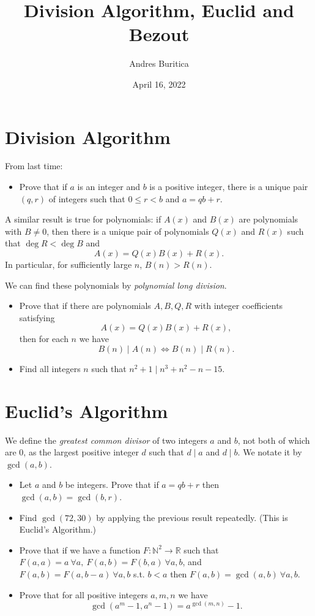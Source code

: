 \documentclass{article}
\title{Division Algorithm, Euclid and Bezout}
\author{Andres Buritica}
\date{April 16, 2022}
\begin{document}
\maketitle
\section{Division Algorithm}
  From last time: 
  \begin{itemize}
    \item Prove that if $a$ is an integer and $b$ is a positive integer, there
      is a unique pair $(q,r)$ of integers such that $0\le r<b$ and $a=qb+r$.
  \end{itemize}
  A similar result is true for polynomials: if $A(x)$ and $B(x)$ are
  polynomials with $B\ne 0$, then there is a unique pair of polynomials $Q(x)$
  and $R(x)$ such that $\deg R<\deg B$ and \[A(x)=Q(x)B(x)+R(x).\]
  In particular, for sufficiently large $n$, $B(n)>R(n)$.

  We can find these polynomials by \emph{polynomial long division}.

  \begin{itemize}
    \item Prove that if there are polynomials $A,B,Q,R$ with integer
      coefficients satisfying
      \[A(x)=Q(x)B(x)+R(x),\] then for each $n$ we have \[B(n)\mid A(n)\iff
        B(n)\mid R(n).\]
    \item Find all integers $n$ such that $n^2+1\mid n^3+n^2-n-15$.
  \end{itemize}
\section{Euclid's Algorithm}
  We define the \emph{greatest common divisor} of two integers $a$ and $b$, not
  both of which are 0, as the largest positive integer $d$ such that $d\mid a$
  and $d\mid b$. We notate it by $\gcd(a,b)$.
  \begin{itemize}
    \item Let $a$ and $b$ be integers. Prove that if $a=qb+r$ then
      $\gcd(a,b)=\gcd(b,r)$.
    \item Find $\gcd(72,30)$ by applying the previous result repeatedly. (This
      is Euclid's Algorithm.)
    \item Prove that if we have a function $F:\mathbb N^2\to\mathbb R$ such that
      $F(a,a)=a\ \forall a,\ F(a,b)=F(b,a)\ \forall a,b$, and
      $F(a,b)=F(a,b-a)\ \forall a,b$ s.t. $b<a$
      then $F(a,b)=\gcd(a,b)\ \forall a,b$.
    \item Prove that for all positive integers $a,m,n$ we have
      \[\gcd(a^m-1,a^n-1)=a^{\gcd(m,n)}-1.\]
  \end{itemize}
\end{document}
